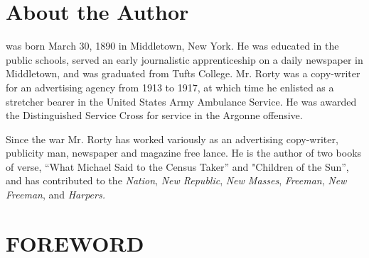 \documentclass[twoside,nohyper,openany,nobib]{tufte-book}
\let\oldchapter\chapter
\def\chapter{%
  \setcounter{footnote}{0}%
  \oldchapter
}
\newcounter{oldtocdepth}
\newcommand{\hidefromtoc}{%
  \setcounter{oldtocdepth}{\value{tocdepth}}%
  \addtocontents{toc}{\protect\setcounter{tocdepth}{-10}}%
}
\newcommand{\unhidefromtoc}{%
  \addtocontents{toc}{\protect\setcounter{tocdepth}{\value{oldtocdepth}}}%
}
\begin{document}
\begin{fullwidth}
\newpage
\thispagestyle{empty}

\begin{adjustwidth}{0pt}{0pt}

\par{}

\end{adjustwidth}

\end{fullwidth}

\thispagestyle{empty}
\begingroup
\setlength{\parindent}{0cm}\setlength{\parskip}{2ex plus 0.3ex minus 0.1ex}
\hidefromtoc
\chapter{About the Author}
\unhidefromtoc


 was born March 30, 1890 in Middletown, New York. He was
educated in the public schools, served an early journalistic
apprenticeship on a daily newspaper in Middletown, and was graduated
from Tufts College. Mr. Rorty was a copy-writer for an advertising
agency from 1913 to 1917, at which time he enlisted as a stretcher
bearer in the United States Army Ambulance Service. He was awarded the
Distinguished Service Cross for service in the Argonne offensive.

Since the war Mr. Rorty has worked variously as an advertising
copy-writer, publicity man, newspaper and magazine free lance. He is the
author of two books of verse, ``What Michael Said to the Census Taker''
and "Children of the Sun'', and has contributed to the \emph{Nation},
\emph{New Republic}, \emph{New Masses}, \emph{Freeman}, \emph{New
Freeman}, and \emph{Harpers.}

\endgroup


\begin{fullwidth}

\tableofcontents

\end{fullwidth}


\chapter{FOREWORD}
\label{ch:foreword}
\end{document}
